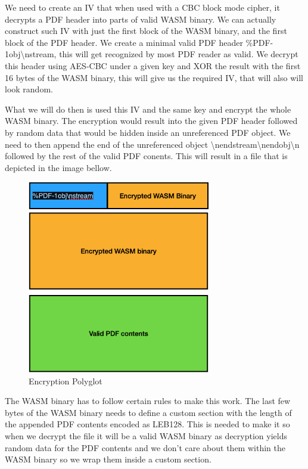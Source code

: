 We need to create an IV that when used with a CBC block mode cipher, it decrypts a PDF header into parts of valid WASM binary. We can actually construct
such IV with just the first block of the WASM binary, and the first block of the PDF header. We create a minimal valid PDF header \%PDF-1obj\textbackslash{}nstream, this will get recognized by most PDF reader as valid.
We decrypt this header using AES-CBC under a given key and XOR the result with the first 16 bytes of the WASM binary, this will give us the required IV, that will also will look random.

What we will do then is used this IV and the same key and encrypt the whole WASM binary. The encryption would result into the given PDF header followed by random data
that would be hidden inside an unreferenced PDF object. We need to then append the end of the unreferenced object \textbackslash{}nendstream\textbackslash{}nendobj\textbackslash{}n
followed by the rest of the valid PDF conents. This will result in a file that is depicted in the image bellow.

\begin{figure}[h]
    \center
    \includegraphics[width=8cm]{images/enc.png}
    \caption{Encryption Polyglot}
\end{figure}

The WASM binary has to follow certain rules to make this work. The last few bytes of the WASM binary needs to define a custom section with the length of the 
appended PDF contents encoded as LEB128. This is needed to make it so when we decrypt the file it will be a valid WASM binary as decryption yields random data for the
PDF contents and we don't care about them within the WASM binary so we wrap them inside a custom section.

